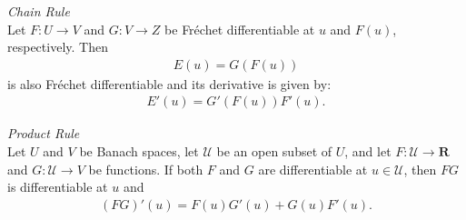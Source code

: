 \theoremstyle{definition}
\begin{definition}\cite{DeLosReyesOptimization} \emph{Chain Rule}\\
Let $F:U\to V$ and $G:V \to Z$ be Fr\'echet differentiable at $u$ and $F(u)$, respectively. Then
\begin{align*}
E(u)=G(F(u))
\end{align*}
is also Fr\'echet differentiable and its derivative is given by:
\begin{align*}
E'(u)=G'(F(u))F'(u).
\end{align*} 
\end{definition}

\theoremstyle{definition}
\begin{definition}\cite{FrechetProductrule1} \emph{Product Rule}\\
Let $U$ and $V$ be Banach spaces, let $\mathcal{U}$ be an open subset of $U$, and let $F: \mathcal{U} \to \mathbf{R}$ and $G: \mathcal{U} \to V$ be functions. If both $F$ and $G$ are differentiable at $u \in \mathcal{U}$, then $FG$ is differentiable at $u$ and 
\begin{align*}
(FG)'(u) = F(u)G'(u)+G(u)F'(u).
\end{align*}
\end{definition}

